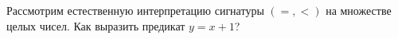 Рассмотрим естественную интерпретацию сигнатуры $(=, <)$ на множестве целых чисел. Как выразить предикат
$y = x + 1$?
